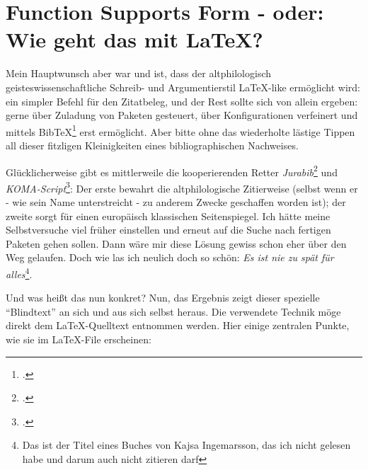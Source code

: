 %
%
%
%


\section{Function Supports Form - oder: Wie geht das mit \LaTeX?}

Mein Hauptwunsch aber war und ist, dass der altphilologisch
geisteswissenschaftliche Schreib- und Argumentierstil \LaTeX-like ermöglicht
wird: ein simpler Befehl für den Zitatbeleg, und der Rest sollte sich von allein
ergeben: gerne über Zuladung von Paketen gesteuert, über Konfigurationen
verfeinert und mittels BibTeX\footcite[vgl.][]{BibtexOrgDe} erst ermöglicht.
Aber bitte ohne das wiederholte lästige Tippen all dieser fitzligen
Kleinigkeiten eines bibliographischen Nachweises.

Glücklicherweise gibt es mittlerweile die kooperierenden Retter
\emph{Jurabib}\footcite[vgl.][]{Berger2004a} und
\emph{KOMA-Script}\footcite[vgl.][]{Kohm2008a}: Der erste bewahrt die
altphilologische Zitierweise (selbst wenn er - wie sein Name unterstreicht - zu
anderem Zwecke geschaffen worden ist); der zweite sorgt für einen europäisch
klassischen Seitenspiegel. Ich hätte meine Selbstversuche viel früher einstellen
und erneut auf die Suche nach fertigen Paketen gehen sollen. Dann wäre mir diese
Lösung gewiss schon eher über den Weg gelaufen. Doch wie las ich neulich doch so
schön: \emph{Es ist nie zu spät für alles}\footnote{Das ist der Titel eines
Buches von Kajsa Ingemarsson, das ich nicht gelesen habe und darum auch nicht
zitieren darf}.

Und was heißt das nun konkret? Nun, das Ergebnis zeigt dieser spezielle
"`Blindtext"' an sich und aus sich selbst heraus. Die verwendete Technik möge
direkt dem \LaTeX-Quelltext entnommen werden. Hier einige zentralen Punkte, wie
sie im \LaTeX-File erscheinen:


